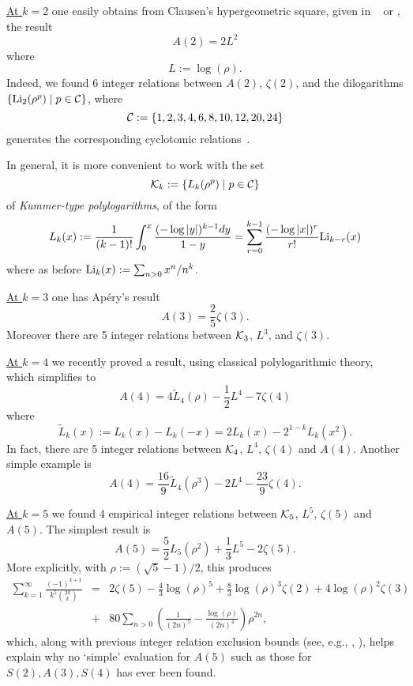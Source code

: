 \documentclass[a4paper,a4paper]{article}
\newcommand{\df}[2]{\mbox{$\frac{#1}{#2}$}}
\begin{document}
\underline{At $k=2$} one easily obtains from       Clausen's
 hypergeometric square, given in ~\cite{AS} or \cite{PA}, the  result
$$A(2)=2L^2$$ where $$L:=\log(\rho).$$ Indeed, we found 6 integer relations
between $A(2)$, $\zeta(2)$, and the dilogarithms
$\{{\rm Li}_2(\rho^p)\mid p\in{\cal C}\}$, where
$${\cal C}:=\{1,2,3,4,6,8,10,12,20,24\}$$
generates the corresponding  cyclotomic relations~\cite{L2}.

In general, it is more convenient to work with the set
$${\cal K}_k:=\{L_k(\rho^p)\mid p\in{\cal C}\}$$
of {\em Kummer-type polylogarithms}, of the form
$$L_k(x):=\frac{1}{(k-1)!}\int_0^x\frac{(-\log|y|)^{k-1}dy}{1-y}
=\sum_{r=0}^{k-1}\frac{(-\log|x|)^r}{r!}{\rm Li}_{k-r}(x)$$
where as before ${\rm Li}_k(x):=\sum_{n>0}x^n/n^k$.

\vspace{\baselineskip}

\underline{At $k=3$} one has Ap\'ery's result $$A(3)=\df25\zeta(3).$$
Moreover there are 5 integer relations between ${\cal K}_3$, $L^3$, and
$\zeta(3)$.

\vspace{\baselineskip}

\underline{At $k=4$} we recently proved a result,
using classical polylogarithmic theory,
 which simplifies to
$$A(4)=4\widetilde{L}_4(\rho)-\df12L^4-7\zeta(4)$$
where $$\widetilde{L}_k(x):=L_k(x)-L_k(-x)=2L_k(x)-2^{1-k}L_k(x^2).$$
In fact, there are 5 integer relations between
${\cal K}_4$, $L^4$, $\zeta(4)$ and $A(4)$.
Another simple example is
$$A(4)=\df{16}{9}\widetilde{L}_4(\rho^3)-2L^4-\df{23}{9}\zeta(4).$$

\vspace{\baselineskip}

\underline{At $k=5$} we found 4
empirical integer relations between ${\cal K}_5$, $L^5$,
$\zeta(5)$ and $A(5)$. The simplest result is
$$A(5)=\df52L_5(\rho^2)+\df13L^5-2\zeta(5).$$
More explicitly,  with $\rho:=(\sqrt5-1)/2$, this produces
\begin{eqnarray}
\sum\limits_{k=1}^\infty {\frac{(-1)^{k+1}}{k^5\binom{2k}k}} &=&2\zeta(5)
-\df43\log(\rho)^5+\df83\log(\rho)^3\zeta(2)+4\log(\rho)^2\zeta(3) \nonumber\\
&+&80\sum\limits_{n>0}\left(\frac{1}{(2n)^5}-
\frac{\log(\rho)}{(2n)^4}\right)\rho^{2n},
\end{eqnarray}
which,  along with previous integer relation exclusion bounds
(see, e.g., \cite{BaB}, \cite{BL}),
 helps explain why no `simple' evaluation for $A(5)$
such as those for $S(2), A(3), S(4)$ has ever been found.
\vspace{\baselineskip}
\end{document}
